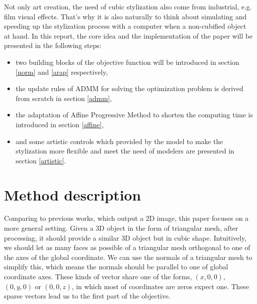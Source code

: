 \documentclass[a4paper,10pt]{article}
\begin{document}
Not only art creation, the need of cubic stylization also come from industrial, e.g. film visual effects. That’s why it is also naturally to think about simulating and speeding up the stylization process with a computer when a non-cubified object at hand. In this report, the core idea and the implementation of the paper \cite{Liu:CubicStyle:2019} will be presented in the following steps:
	\begin{itemize}
		\item two building blocks of the objective function will be introduced in section \ref{norm} and \ref{arap} respectively, 
		\item the update rules of ADMM for solving the optimization problem is derived from scratch in section \ref{admm},
		\item the adaptation of Affine Progressive Method to shorten the computing time is introduced in section \ref{affine},
		\item and some artistic controls which provided by the model to make the stylization more flexible and meet the need of modelers are presented in section \ref{artistic}.
	\end{itemize}

\section{Method description}\label{descrip}
Comparing to previous works, which output a 2D image, this paper focuses on a more general setting. Given a 3D object in the form of triangular mesh, after processing, it should provide a similar 3D object but in cubic shape. Intuitively, we should let as many faces as possible of a triangular mesh orthogonal to one of the axes of the global coordinate. We can use the normals of a triangular mesh to simplify this, which means the normals should be parallel to one of global coordinate axes. These kinds of vector share one of the forms, $(x,0,0)$, $(0,y,0)$ or $(0,0,z)$, in which most of coordinates are zeros expect one. These sparse vectors lead us to the first part of the objective.

\end{document}
